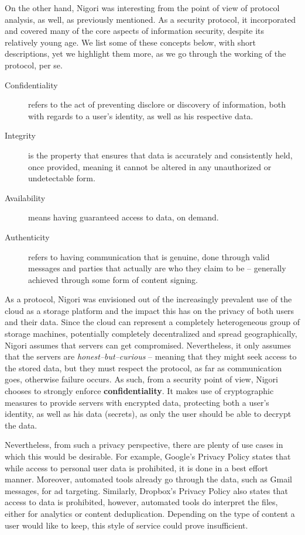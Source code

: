 
On the other hand, Nigori was interesting from the point of view of protocol analysis, as well, as previously mentioned.
As a security protocol, it incorporated and covered many of the core aspects of information security, despite its relatively young age.
We list some of these concepts below, with short descriptions, yet we highlight them more, as we go through the working of the protocol, per se.
\begin{description}
\item[Confidentiality] refers to the act of preventing disclore or discovery of information, both with regards to a user's identity, as well as his respective data.

\item[Integrity] is the property that ensures that data is accurately and consistently held, once provided, meaning it cannot be altered in any unauthorized or undetectable form.

\item[Availability] means having guaranteed access to data, on demand.

\item[Authenticity] refers to having communication that is genuine, done through valid messages and parties that actually are who they claim to be -- generally achieved through some form of content signing.
\end{description}

As a protocol, Nigori was envisioned out of the increasingly prevalent use of the cloud as a storage platform and the impact this has on the privacy of both users and their data.
Since the cloud can represent a completely heterogeneous group of storage machines, potentially completely decentralized and spread geographically, Nigori assumes that servers can get compromised.
Nevertheless, it only assumes that the servers are \textit{honest--but--curious} -- meaning that they might seek access to the stored data, but they must respect the protocol, as far as communication goes, otherwise failure occurs.
As such, from a security point of view, Nigori chooses to strongly enforce \textbf{confidentiality}.
It makes use of cryptographic measures to provide servers with encrypted data, protecting both a user's identity, as well as his data (secrets), as only the user should be able to decrypt the data.

Nevertheless, from such a privacy perspective, there are plenty of use cases in which this would be desirable.
For example, Google's Privacy Policy \cite{GooglePrivacy} states that while access to personal user data is prohibited, it is done in a best effort manner.
Moreover, automated tools already go through the data, such as Gmail messages, for ad targeting.
Similarly, Dropbox's Privacy Policy \cite{DropboxPolicy} also states that access to data is prohibited, however, automated tools do interpret the files, either for analytics or content deduplication.
Depending on the type of content a user would like to keep, this style of service could prove insufficient.

